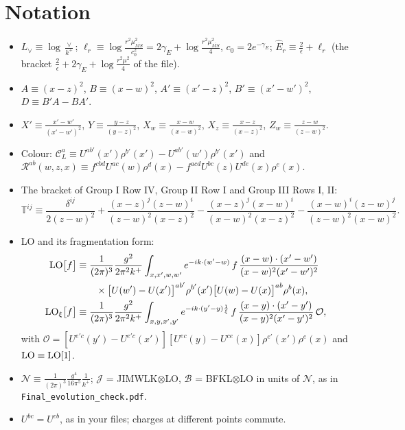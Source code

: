 \documentclass[10pt]{article}
\numberwithin{equation}{section}
\newcommand{\Lv}{L_{\vee}}
\newcommand{\CL}{\mathcal C_L}
\newcommand{\Rc}{\mathcal R}
\newcommand{\OO}{\mathcal O}
\newcommand{\JJ}{\mathcal J}
\newcommand{\BB}{\mathcal B}
\newcommand{\NN}{\mathcal N}
\newcommand{\Eh}{\hat E}
\newcommand{\LOx}[1]{{\rm LO}_\xi\big[#1\big]}
\newcommand{\pre}{\frac{1}{(2\pi)^3}}
\newcommand{\phw}{e^{-ik\cdot(w'-w)}}
\begin{document}
\section{Notation}\label{sec:notation}
\begin{itemize}
\item $\Lv\equiv\log\frac{\vee}{k^+}$; $\ell_r\equiv\log\frac{r^2\mu^2_{\overline{MS}}}{c_0^2}=2\gamma_E+\log\frac{r^2\mu^2_{\overline{MS}}}{4}$, $c_0=2e^{-\gamma_E}$; $\Eh_r\equiv\frac{2}{\epsilon}+\ell_r$ (the bracket $\frac2\epsilon+2\gamma_E+\log\frac{r^2\mu^2}{4}$ of the file).
\item $A\equiv(x-z)^2$, $B\equiv(x-w)^2$, $A'\equiv(x'-z)^2$, $B'\equiv(x'-w')^2$, $D\equiv B'A-BA'$.
\item $X'\equiv\frac{x'-w'}{(x'-w')^2}$, $Y\equiv\frac{y-z}{(y-z)^2}$, $X_w\equiv\frac{x-w}{(x-w)^2}$, $X_z\equiv\frac{x-z}{(x-z)^2}$, $Z_w\equiv\frac{z-w}{(z-w)^2}$.
\item Colour: $\CL^a\equiv U^{ab'}(x')\rho^{b'}(x')-U^{ab'}(w')\rho^{b'}(x')$ and $\Rc^{ab}(w,z,x)\equiv f^{cbd}U^{ac}(w)\rho^d(x)-f^{acd}U^{bc}(z)U^{de}(x)\rho^e(x)$.
\item The bracket of Group I Row IV, Group II Row I and Group III Rows I, II:
\begin{equation*}
\mathbb T^{ij}\equiv\frac{\delta^{ij}}{2(z-w)^2}+\frac{(x-z)^j(z-w)^i}{(z-w)^2(x-z)^2}-\frac{(x-z)^j(x-w)^i}{(x-w)^2(x-z)^2}-\frac{(x-w)^i(z-w)^j}{(z-w)^2(x-w)^2}.
\end{equation*}
\item LO and its fragmentation form:
\begin{align*}
{\rm LO}\big[f\big]&\equiv\pre\frac{g^2}{2\pi^2k^+}\int_{x,x',w,w'}\phw\,f\,\frac{(x-w)\cdot(x'-w')}{(x-w)^2(x'-w')^2}\\&\qquad\times\big[U(w')-U(x')\big]^{ab'}\rho^{b'}(x')\big[U(w)-U(x)\big]^{ab}\rho^b(x),\\
\LOx{f}&\equiv\pre\frac{g^2}{2\pi^2k^+}\int_{x,y,x',y'}e^{-ik\cdot(y'-y)\frac1\xi}\,f\,\frac{(x-y)\cdot(x'-y')}{(x-y)^2(x'-y')^2}\,\OO ,
\end{align*}
with $\OO=[U^{e'c}(y')-U^{e'c}(x')][U^{ec}(y)-U^{ce}(x)]\rho^{e'}(x')\rho^e(x)$ and ${\rm LO}\equiv{\rm LO}[1]$.
\item $\NN\equiv\pre\frac{g^4}{16\pi^5}\frac{1}{k^+}$; $\JJ$ = JIMWLK$\otimes$LO, $\BB$ = BFKL$\otimes$LO in units of $\NN$, as in \texttt{Final\_evolution\_check.pdf}.
\item $U^{bc}=U^{cb}$, as in your files; charges at different points commute.
\end{itemize}
\end{document}
